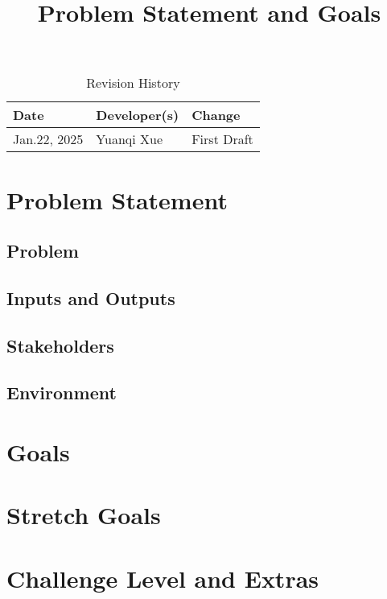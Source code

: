 \documentclass{article}
\title{Problem Statement and Goals\\\progname}
\author{\authname}
\date{}
\begin{document}
\maketitle

\begin{table}[hp]
\caption{Revision History} \label{TblRevisionHistory}
\begin{tabularx}{\textwidth}{llX}
\toprule
\textbf{Date} & \textbf{Developer(s)} & \textbf{Change}\\
\midrule
Jan.22, 2025 & Yuanqi Xue & First Draft\\
\bottomrule
\end{tabularx}
\end{table}

\section{Problem Statement}


\subsection{Problem}

\subsection{Inputs and Outputs}



\subsection{Stakeholders}

\subsection{Environment}



\section{Goals}

\section{Stretch Goals}

\section{Challenge Level and Extras}
\end{document}
